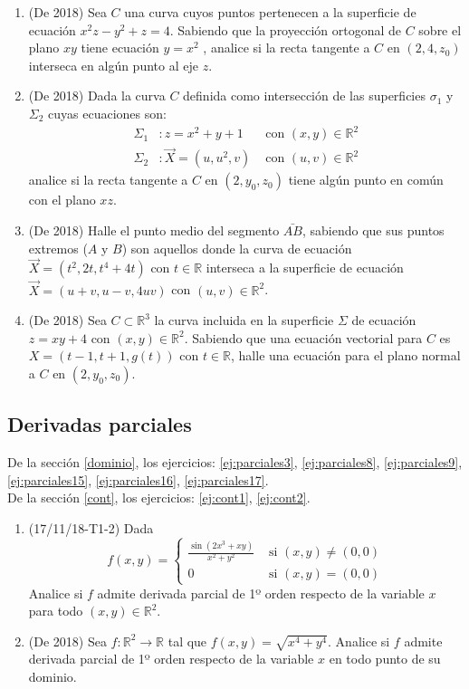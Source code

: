 \documentclass[12pt,a4paper]{article}
\newcommand{\R}{\mathbb{R}}
\begin{document}
\begin{enumerate}
	\item (De 2018) Sea $ C $ una curva cuyos puntos pertenecen a la superficie de ecuación $ x^2 z -y^2 +z = 4  $. Sabiendo que la proyección ortogonal de $ C $ sobre el plano $ xy $ tiene ecuación $ y = x^2 $ , analice si la recta tangente a $ C $ en $ (2, 4, z_0 ) $ interseca en algún punto al eje $ z $.
	
	\item (De 2018) Dada la curva $ C $ definida como intersección de las superficies $ \sigma_1 $ y $ \Sigma_2 $ cuyas ecuaciones son:
	\begin{align*}
		\Sigma_1 &: z = x^2 + y + 1 &\text{ con } (x, y) \in\R^2\\
		\Sigma_2 &: \vec{X} = (u , u^2 , v) &\text{ con } (u, v) \in \R^2
	\end{align*}
	analice si la recta tangente a $ C $ en $ (2, y_0 , z_0 ) $ tiene algún punto en común con el plano $ xz $.
	
	\item (De 2018) Halle el punto medio del segmento $\bar{AB}$, sabiendo que sus puntos extremos ($ A $ y $ B $) son aquellos donde la curva de ecuación $ \vec{X} = (t^2 , 2 t , t^4 +4 t) $ con $t \in \R$ interseca a la superficie de ecuación $ \vec{X} = (u + v , u - v , 4 u v) $ con $(u, v) \in \R^2$.
	
	\item (De 2018) Sea $ C \subset\R^3 $ la curva incluida en la superficie $\Sigma$ de ecuación $ z = x y + 4  $ con $ (x, y)\in\R^2$. Sabiendo que una ecuación vectorial para $ C $ es $ X = (t - 1 , t + 1 , g(t)) $ con $ t\in\R$, halle una ecuación para el plano normal a $ C $ en $ (2, y_0 , z_0 ) $.
	
\end{enumerate}

\subsection{Derivadas parciales}
De la sección \ref{dominio}, los ejercicios: \ref{ej:parciales3}, \ref{ej:parciales8}, \ref{ej:parciales9}, \ref{ej:parciales15}, 
\ref{ej:parciales16}, \ref{ej:parciales17}.\\

De la sección \ref{cont}, los ejercicios: \ref{ej:cont1}, \ref{ej:cont2}.\\
\begin{enumerate}
	\item (17/11/18-T1-2) Dada 
	\[f ( x , y ) = \begin{cases}
		\frac{\sin(2x^3+xy)}{x^2+y^2} & \text{ si } (x,y)\neq(0,0)\\
		0 & \text{ si } (x,y)=(0,0)
	\end{cases}\]
	Analice si $ f $ admite derivada parcial de 1º orden respecto de la variable $ x $ para todo $ ( x , y ) \in \R^2$.
	
	\item (De 2018) Sea $ f : \R^2 \rightarrow \R $ tal que $ f(x, y) = \sqrt{x^4 + y^4}  $. Analice si $ f $ admite derivada parcial de 1º orden respecto de la variable $ x $ en todo punto de su dominio.
\end{enumerate}
\end{document}
